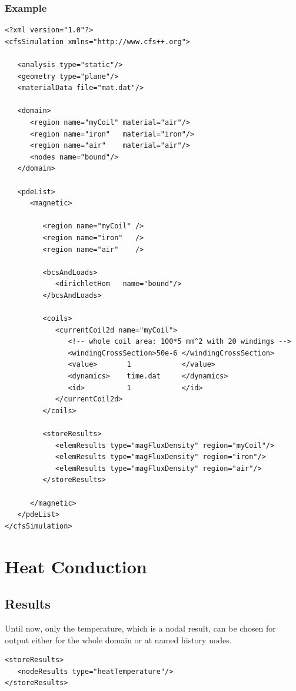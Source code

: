 \subsubsection{Example}
{\footnotesize
\begin{verbatim}
<?xml version="1.0"?>
<cfsSimulation xmlns="http://www.cfs++.org">

   <analysis type="static"/>
   <geometry type="plane"/>
   <materialData file="mat.dat"/>

   <domain>
      <region name="myCoil" material="air"/>
      <region name="iron"   material="iron"/>
      <region name="air"    material="air"/>
      <nodes name="bound"/>
   </domain>

   <pdeList>
      <magnetic>

         <region name="myCoil" />
         <region name="iron"   />
         <region name="air"    />

         <bcsAndLoads>
            <dirichletHom   name="bound"/>
         </bcsAndLoads>

         <coils>
            <currentCoil2d name="myCoil">
               <!-- whole coil area: 100*5 mm^2 with 20 windings -->
               <windingCrossSection>50e-6 </windingCrossSection>
               <value>       1            </value>
               <dynamics>    time.dat     </dynamics>
               <id>          1            </id>
            </currentCoil2d>
         </coils>

         <storeResults>
            <elemResults type="magFluxDensity" region="myCoil"/>
            <elemResults type="magFluxDensity" region="iron"/>
            <elemResults type="magFluxDensity" region="air"/>
         </storeResults>

      </magnetic>
   </pdeList>
</cfsSimulation>
\end{verbatim}
}

\newpage
\section{Heat Conduction}
\subsection{Results}
Until now, only the temperature, which is a nodal result, can be chosen for output either for the whole domain or at named history nodes.

\begin{verbatim}
<storeResults>
   <nodeResults type="heatTemperature"/>
</storeResults>
\end{verbatim}


